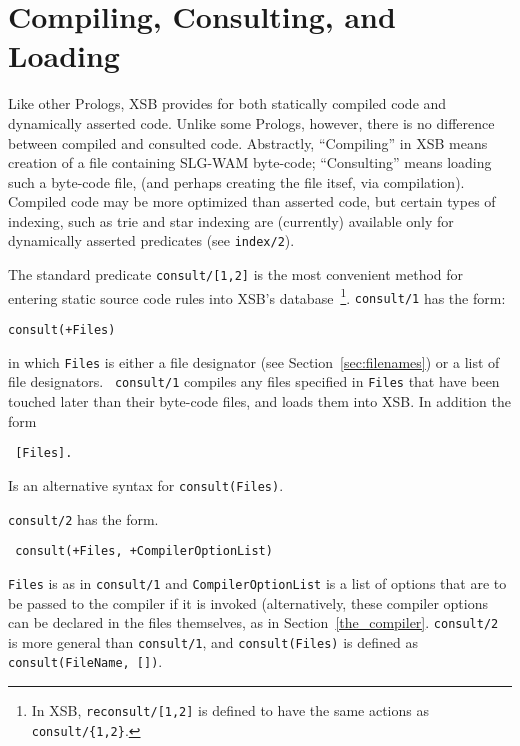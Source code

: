 \section{Compiling, Consulting, and Loading} \label{Consulting}
Like other Prologs, XSB provides for both statically compiled code and
dynamically asserted code.  Unlike some Prologs, however, there is no
difference between compiled and consulted code.  Abstractly,
``Compiling'' in XSB means creation of a file containing SLG-WAM
byte-code; ``Consulting'' means loading such a byte-code file, (and
perhaps creating the file itsef, via compilation).  Compiled code may
be more optimized than asserted code, but certain types of indexing,
such as trie and star indexing are (currently) available only for
dynamically asserted predicates (see {\tt index/2}).

The standard predicate {\tt consult/[1,2]} is the most convenient
method for entering static source code rules into XSB's
database~\footnote{In XSB, {\tt reconsult/[1,2]} is defined to have
the same actions as {\tt consult/\{1,2\}}.}.  {\tt consult/1} has the
form: 
%
\begin{center}
{\tt consult(+Files)}
\end{center}
%
in which {\tt Files} is either a file designator (see
Section~\ref{sec:filenames}) or a list of file designators.  {\tt
consult/1} compiles any files specified in {\tt Files} that have been
touched later than their byte-code files, and loads them into XSB.  In
addition the form
%
\begin{center}{\tt
	    [Files]. 
}\end{center}
%
Is an alternative syntax for {\tt consult(Files)}.

{\tt consult/2} has the form.
\begin{center}{\tt
	consult(+Files, +CompilerOptionList) }
\end{center} 
{\tt Files} is as in {\tt consult/1} and {\tt CompilerOptionList}
is a list of options that are to be passed to the compiler if it is
invoked (alternatively, these compiler options can be declared in the
files themselves, as in Section~\ref{the_compiler}.  {\tt consult/2}
is more general than {\tt consult/1}, and {\tt consult(Files)} is
defined as {\tt 	consult(FileName, [])}.

